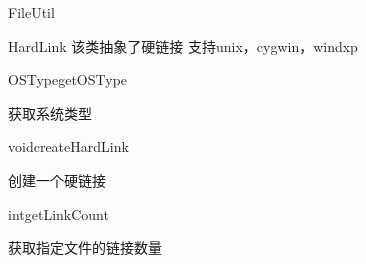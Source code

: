 \begin{XeClass}{FileUtil}
\begin{XeInnerClass}{HardLink}
 该类抽象了硬链接
 支持unix，cygwin，windxp

        \begin{XeMethod}{\XePrivate}{OSType}{getOSType}
             
 获取系统类型

        \end{XeMethod}

        \begin{XeMethod}{\XePublic}{void}{createHardLink}
             
 创建一个硬链接

        \end{XeMethod}

        \begin{XeMethod}{\XePublic}{int}{getLinkCount}
             
 获取指定文件的链接数量

        \end{XeMethod}

    \end{XeInnerClass}
\end{XeClass}
